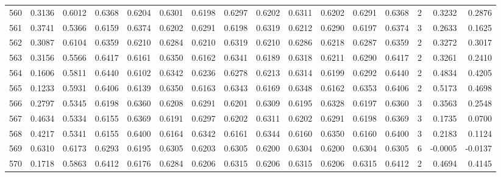 \begin{tabular}{lrrrrrrrrrrrrrrr}
560 &      0.3136 &  0.6012 &  0.6368 &  0.6204 &  0.6301 &  0.6198 &  0.6297 &  0.6202 &  0.6311 &  0.6202 &   0.6291 &     0.6368 &      2 &                    0.3232 &                     0.2876 \\
561 &      0.3741 &  0.5366 &  0.6159 &  0.6374 &  0.6202 &  0.6291 &  0.6198 &  0.6319 &  0.6212 &  0.6290 &   0.6197 &     0.6374 &      3 &                    0.2633 &                     0.1625 \\
562 &      0.3087 &  0.6104 &  0.6359 &  0.6210 &  0.6284 &  0.6210 &  0.6319 &  0.6210 &  0.6286 &  0.6218 &   0.6287 &     0.6359 &      2 &                    0.3272 &                     0.3017 \\
563 &      0.3156 &  0.5566 &  0.6417 &  0.6161 &  0.6350 &  0.6162 &  0.6341 &  0.6189 &  0.6318 &  0.6211 &   0.6290 &     0.6417 &      2 &                    0.3261 &                     0.2410 \\
564 &      0.1606 &  0.5811 &  0.6440 &  0.6102 &  0.6342 &  0.6236 &  0.6278 &  0.6213 &  0.6314 &  0.6199 &   0.6292 &     0.6440 &      2 &                    0.4834 &                     0.4205 \\
565 &      0.1233 &  0.5931 &  0.6406 &  0.6139 &  0.6350 &  0.6163 &  0.6343 &  0.6169 &  0.6348 &  0.6162 &   0.6353 &     0.6406 &      2 &                    0.5173 &                     0.4698 \\
566 &      0.2797 &  0.5345 &  0.6198 &  0.6360 &  0.6208 &  0.6291 &  0.6201 &  0.6309 &  0.6195 &  0.6328 &   0.6197 &     0.6360 &      3 &                    0.3563 &                     0.2548 \\
567 &      0.4634 &  0.5334 &  0.6155 &  0.6369 &  0.6191 &  0.6297 &  0.6202 &  0.6311 &  0.6202 &  0.6291 &   0.6198 &     0.6369 &      3 &                    0.1735 &                     0.0700 \\
568 &      0.4217 &  0.5341 &  0.6155 &  0.6400 &  0.6164 &  0.6342 &  0.6161 &  0.6344 &  0.6160 &  0.6350 &   0.6160 &     0.6400 &      3 &                    0.2183 &                     0.1124 \\
569 &      0.6310 &  0.6173 &  0.6293 &  0.6195 &  0.6305 &  0.6203 &  0.6305 &  0.6200 &  0.6304 &  0.6200 &   0.6304 &     0.6305 &      6 &                   -0.0005 &                    -0.0137 \\
570 &      0.1718 &  0.5863 &  0.6412 &  0.6176 &  0.6284 &  0.6206 &  0.6315 &  0.6206 &  0.6315 &  0.6206 &   0.6315 &     0.6412 &      2 &                    0.4694 &                     0.4145 \\

\end{tabular}
